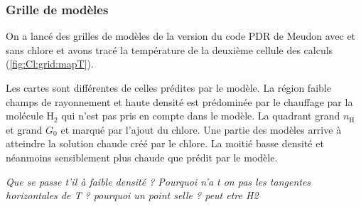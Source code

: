 \subsubsection{Grille de modèles}

On a lancé des grilles de modèles de la version \uncinq du code PDR de Meudon avec et sans chlore et avons tracé la température de la deuxième cellule des calculs (\ref{fig:Cl:grid:mapT}). \newline 

Les cartes sont différentes de celles prédites par le modèle. La région faible champs de rayonnement et haute densité est prédominée par le chauffage par la molécule $\mathrm{H}_2$ qui n'est pas pris en compte dans le modèle. La quadrant grand $n_\mathrm{H}$ et grand $G_0$ et marqué par l'ajout du chlore. Une partie des modèles arrive à atteindre la solution chaude créé par le chlore. La moitié basse densité et néanmoins sensiblement plus chaude que prédit par le modèle. 

\textit{Que se passe t'il à faible densité ? Pourquoi n'a t on pas les tangentes horizontales de T ? pourquoi un point selle ? peut etre H2}

